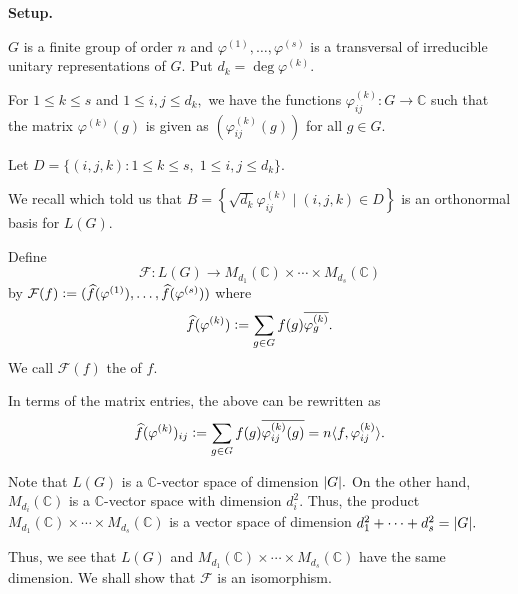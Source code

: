 \begin{aside}
    \textbf{Setup.}

    $G$ is a finite group of order $n$ and $\varphi^{(1)}, \ldots, \varphi^{(s)}$ is a transversal of irreducible unitary representations of $G.$ Put $d_k = \deg \varphi^{(k)}.$ 

    For $1 \le k \le s$ and $1 \le i, j \le d_k,$ we have the functions $\varphi^{(k)}_{ij} : G \to \mathbb{C}$ such that the matrix $\varphi^{(k)}(g)$ is given as $(\varphi^{(k)}_{ij}(g))$ for all $g \in G.$

    Let $D = \{(i, j, k) : 1 \le k \le s,\; 1 \le i, j \le d_k\}.$

    We recall  which told us that $B = \left\{\sqrt{d_k}\varphi_{ij}^{(k)} \mid (i, j, k) \in D\right\}$ is an orthonormal basis for $L(G).$
\end{aside}

\begin{defn}%
    Define
    \begin{equation*} 
        \mathcal{F} : L(G) \to M_{d_1}(\mathbb{C}) \times \cdots \times M_{d_s}(\mathbb{C})
    \end{equation*}
    by $\mathcal{F}(f) \vcentcolon= (\widehat{f}(\varphi^{(1)}), \ldots, \widehat{f}(\varphi^{(s)}))$ where
    \begin{equation*}
        \widehat{f}(\varphi^{(k)}) \vcentcolon= \sum_{g \in G} f(g)\overline{\varphi^{(k)}_g}.
    \end{equation*}
    We call $\mathcal{F}(f)$ the  of $f.$
\end{defn}
\begin{rem}
    In terms of the matrix entries, the above can be rewritten as
    \begin{equation} \label{eq:012}
        \widehat{f}(\varphi^{(k)})_{ij} \vcentcolon= \sum_{g \in G} f(g)\overline{\varphi^{(k)}_{ij}(g)} = n\langle f, \varphi^{(k)}_{ij}\rangle.
    \end{equation}
\end{rem}

\begin{rem} \label{rem:dimLGdimmatrix}
    Note that $L(G)$ is a $\mathbb{C}$-vector space of dimension ${\left\lvert G \right\lvert}.$ On the other hand, $M_{d_i}(\mathbb{C})$ is a $\mathbb{C}$-vector space with dimension $d_i^2.$ Thus, the product $M_{d_1}(\mathbb{C}) \times \cdots \times M_{d_s}(\mathbb{C})$ is a vector space of dimension $d_1^2 + \cdots + d_s^2 = {\left\lvert G \right\lvert}.$

    Thus, we see that $L(G)$ and $M_{d_1}(\mathbb{C}) \times \cdots \times M_{d_s}(\mathbb{C})$ have the same dimension. We shall show that $\mathcal{F}$ is an isomorphism.
\end{rem}

